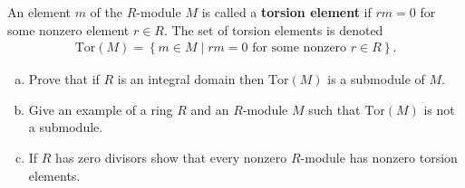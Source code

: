 \documentclass[num=2,duedate=02-10-21,course=Algebra\ II,proflastname=Walton]{hwtemplate}
\begin{document}
\problem[6]
\begin{claim}
	
An element \(m\) of the \(R\)-module \(M\) is called a \textbf{torsion element} if \(rm = 0\) for some nonzero element \(r \in R\). The set of torsion elements is denoted
\begin{align*}
	\textrm{Tor}(M) = \left\{m \in M \mid rm = 0 \text{ for some nonzero }r \in R \right\} .
\end{align*}

\begin{enumerate}[(a).]
	\item Prove that if \(R\) is an integral domain then \( \textrm{Tor}(M)\) is a submodule of \(M\).
	\item Give an example of a ring \(R\) and an \(R\)-module \(M\) such that \( \textrm{Tor}(M)\) is not a submodule. %
	\item If \(R\) has zero divisors show that every nonzero \(R\)-module has nonzero torsion elements.
\end{enumerate}

\end{claim}
\end{document}
